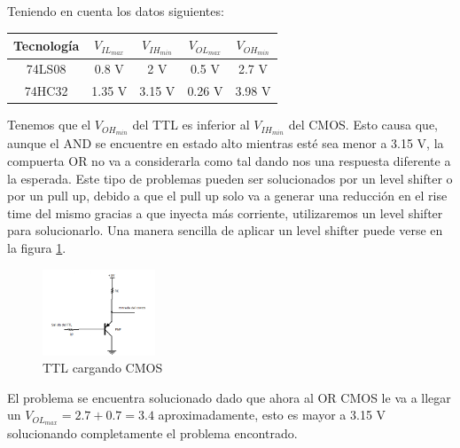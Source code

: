 Teniendo en cuenta los datos siguientes:

\begin{table}[H]
	\centering
	\begin{tabular}{|c|c|c|c|c|}
		\hline
		Tecnología & $V_{IL_{max}}$	& $V_{IH_{min}}$ & $V_{OL_{max}}$ & $V_{OH_{min}}$\\
		\hline
		{74LS08} & 0.8 V & 2 V & 0.5 V & 2.7 V\\
		\hline
		{74HC32} & 1.35 V & 3.15 V & 0.26 V & 3.98 V\\
		\hline
	\end{tabular}
\end{table}

Tenemos que el $V_{OH_{min}}$ del TTL es inferior al $V_{IH_{min}}$ del CMOS. Esto causa que, aunque el AND se encuentre en estado alto mientras esté sea menor a 3.15 V, la compuerta OR no va a considerarla como tal dando nos una respuesta diferente a la esperada.
Este tipo de problemas pueden ser solucionados por un level shifter o por un pull up, debido a que el pull up solo va a generar una reducción en el rise time del mismo gracias a que inyecta más corriente, utilizaremos un level shifter para solucionarlo.
Una manera sencilla de aplicar un level shifter puede verse en la figura \ref{fig:eje5_2}.

\begin{figure}[H]
	\centering
	\includegraphics[width=0.3\textwidth]{Ejercicio5/Levelshifter.png}
	\caption{TTL cargando CMOS}
	\label{fig:eje5_2}
\end{figure}

El problema se encuentra solucionado dado que ahora al OR CMOS le va a llegar un $V_{OL_{max}}=2.7+0.7=3.4$ aproximadamente, esto es mayor a 3.15 V solucionando completamente el problema encontrado.

